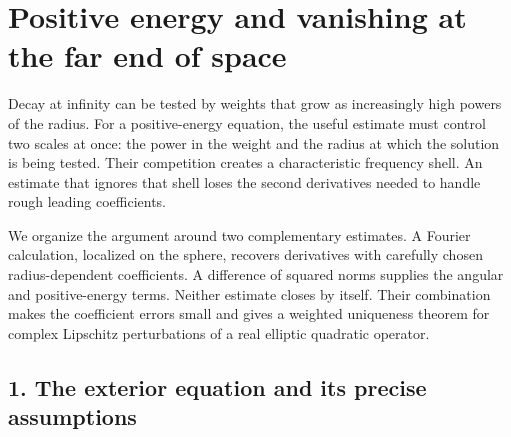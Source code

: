 \documentclass[
  11pt,
]{article}
\author{}
\date{}
\makeatletter
\let\ReaderOriginalAnchorStart\hyper@anchorstart
\let\ReaderOriginalAnchorEnd\hyper@anchorend
\let\ReaderPendingAliases\@empty
\def\ReaderArmAliases#1{\gdef\ReaderPendingAliases{#1}}
\def\hyper@anchorstart#1{\ReaderIfNativeAnchorTF{#1}{\ReaderPendingAliases\global\let\ReaderPendingAliases\@empty}{}\ReaderOriginalAnchorStart{#1}}
\makeatother
\begin{document}
\ReaderArmAliases{\ReaderOriginalAnchorStart{positive-energy-and-vanishing-at-the-far-end-of-space}\ReaderOriginalAnchorEnd}
\section{Positive energy and vanishing at the far end of
space}\label{positive-energy-and-vanishing-at-the-far-end-of-space}

Decay at infinity can be tested by weights that grow as increasingly
high powers of the radius. For a positive-energy equation, the useful
estimate must control two scales at once: the power in the weight and
the radius at which the solution is being tested. Their competition
creates a characteristic frequency shell. An estimate that ignores that
shell loses the second derivatives needed to handle rough leading
coefficients.

We organize the argument around two complementary estimates. A Fourier
calculation, localized on the sphere, recovers derivatives with
carefully chosen radius-dependent coefficients. A difference of squared
norms supplies the angular and positive-energy terms. Neither estimate
closes by itself. Their combination makes the coefficient errors small
and gives a weighted uniqueness theorem for complex Lipschitz
perturbations of a real elliptic quadratic operator.

\ReaderArmAliases{\ReaderOriginalAnchorStart{AN03-EXU-001}\ReaderOriginalAnchorEnd\begingroup\expandafter\def\csname @currentHref\endcsname{AN03-EXU-001}\label{AN03-EXU-001}\endgroup\ReaderOriginalAnchorStart{an03-exu-001-the-exterior-equation-and-its-precise-assumptions}\ReaderOriginalAnchorEnd\begingroup\expandafter\def\csname @currentHref\endcsname{an03-exu-001-the-exterior-equation-and-its-precise-assumptions}\label{an03-exu-001-the-exterior-equation-and-its-precise-assumptions}\endgroup\ReaderOriginalAnchorStart{1-the-exterior-equation-and-its-precise-assumptions}\ReaderOriginalAnchorEnd\begingroup\expandafter\def\csname @currentHref\endcsname{1-the-exterior-equation-and-its-precise-assumptions}\label{1-the-exterior-equation-and-its-precise-assumptions}\endgroup\ReaderOriginalAnchorStart{the-exterior-equation-and-its-precise-assumptions}\ReaderOriginalAnchorEnd}
\subsection{1. The exterior equation and its precise
assumptions}\label{the-exterior-equation-and-its-precise-assumptions}
\end{document}
